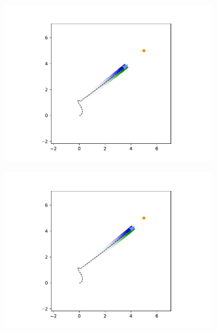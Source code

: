 \documentclass[main.tex]{subfiles}
\begin{document}
\begin{figure}[h]
\begin{subfigure}{0.20\textwidth}
        \includegraphics[width=\textwidth]{figures/Simulations/sim1/frame_7.pdf}
    \end{subfigure}%
    \hfill
    \begin{subfigure}{0.20\textwidth}
        \centering
        \includegraphics[width=\textwidth]{figures/Simulations/sim1/frame_8.pdf}
    \end{subfigure}%
    \hfill
    \begin{subfigure}{0.20\textwidth}
        \centering

\end{subfigure}
\end{figure}
\end{document}
